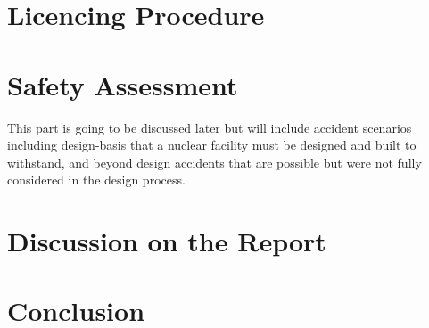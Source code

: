 \documentclass[10pt,a4paper]{article}
\begin{document}
\section{Licencing Procedure}


\section{Safety Assessment}
This part is going to be discussed later but will include accident scenarios including design-basis that a nuclear facility must be designed and built to withstand, and beyond design accidents that are possible but were not fully considered in the design process.

\section{Discussion on the Report}


\section{Conclusion}
\end{document}
